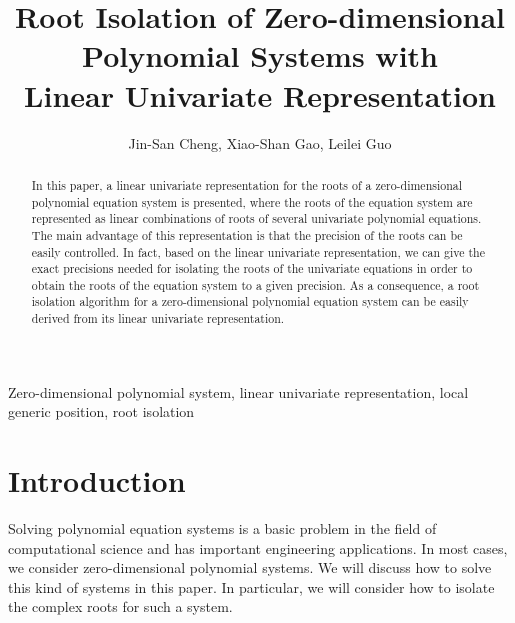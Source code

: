 \documentclass[amsthm]{JSC_LaTex_2007_Mar_12/elsart}
\begin{document}
\begin{frontmatter}





\title{Root Isolation of Zero-dimensional\\ Polynomial Systems with \\Linear Univariate Representation}
\author{Jin-San Cheng, Xiao-Shan Gao, Leilei Guo}

\address{
KLMM, Institute of Systems Science, AMSS, Chinese Academy of Sciences\\
Email: xgao@mmrc.iss.ac.cn,jcheng@amss.ac.cn}



\begin{abstract}
In this paper, a linear univariate representation for the roots of a
zero-dimensional polynomial equation system is presented, where the
roots of the equation system are represented as linear combinations
of roots of several univariate polynomial equations. The main
advantage of this representation is that the precision of the roots
can be easily controlled. In fact, based on the linear univariate
representation, we can give the exact precisions needed for
isolating the roots of the univariate equations in order to obtain
the roots of the equation system to a given precision. As a
consequence, a root isolation algorithm for a zero-dimensional
polynomial equation system can be easily derived from its linear
univariate representation.
\end{abstract}
\begin{keyword}
Zero-dimensional polynomial system,
 linear univariate representation, local generic position, root isolation
\end{keyword}

\end{frontmatter}

\section{Introduction}
Solving polynomial equation systems is a basic problem in the field
of computational science and has important engineering applications.
In most cases, we consider zero-dimensional polynomial systems. We
will discuss how to solve this kind of systems in this paper. In
particular, we will consider how to isolate the complex roots for
such a system.
\end{document}
